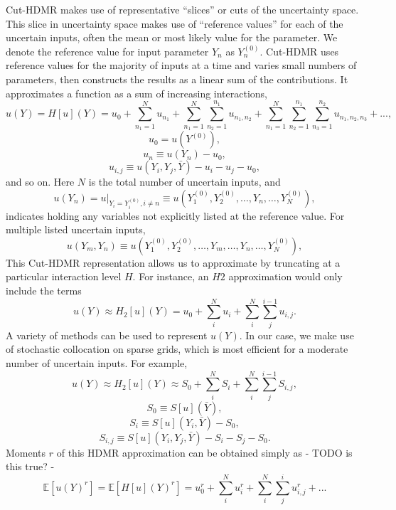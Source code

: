 \documentclass{mc2015}
\newcommand{\expv}[1]{\ensuremath{\mathbb{E}[ #1]}}
\begin{document}
Cut-HDMR makes use of representative ``slices'' or cuts of the uncertainty space.  This slice in uncertainty space makes use of ``reference values'' for each of the uncertain inputs, often the mean or most likely value for the parameter.  We denote the reference value for input parameter $Y_n$ as $Y_n^{(0)}$.  Cut-HDMR uses reference values for the majority of inputs at a time and varies small numbers of parameters, then constructs the results as a linear sum of the contributions.
It approximates a function as a sum of increasing interactions,
\begin{equation}
u(Y)= H[u](Y)=u_0 + \sum_{n_1=1}^N u_{n_1} + \sum_{n_1=1}^N\sum_{n_2=1}^{n_1} u_{n_1,n_2} + 
                     \sum_{n_1=1}^N\sum_{n_2=1}^{n_1}\sum_{n_3=1}^{n_2}u_{n_1,n_2,n_3}+...,
\end{equation}
\begin{equation}
u_0=u(Y^{(0)}),
\end{equation}
\begin{equation}
u_{n}\equiv u(Y_n) - u_0,
\end{equation}
\begin{equation}
u_{i,j}\equiv u(Y_i,Y_j,\bar Y) - u_i - u_j - u_0,
\end{equation}
and so on.  Here $N$ is the total number of uncertain inputs, and 
\begin{equation}
u(Y_{n})=u\big|_{Y_i=Y_i^{(0)},i\neq n}\equiv u(Y_1^{(0)},Y_2^{(0)},\ldots,Y_n,\ldots,Y_N^{(0)}),
\end{equation}
indicates holding any variables not explicitly listed at the reference value.  For multiple listed uncertain inputs,
\begin{equation}
u(Y_m,Y_{n})\equiv u(Y_1^{(0)},Y_2^{(0)},\ldots,Y_m,\ldots,Y_n,\ldots,Y_N^{(0)}),
\end{equation}
This Cut-HDMR representation allows us to approximate by truncating at a particular interaction level $H$.  For instance, an $H2$ approximation would only include the terms
\begin{equation}
u(Y)\approx H_2[u](Y) = u_0 + \sum_i^N u_i + \sum_i^N\sum_j^{i-1} u_{i,j}.
\end{equation}
A variety of methods can be used to represent $u(Y)$.  In our case, we make use of stochastic collocation on sparse grids, which is most efficient for a moderate number of uncertain inputs.  For example,
\begin{equation}
u(Y)\approx H_2[u](Y)\approx S_0 + \sum_i^N S_i + \sum_i^N\sum_j^{i-1} S_{i,j},
\end{equation}
\begin{equation}
S_0\equiv S[u](\bar Y),
\end{equation}
\begin{equation}
S_i\equiv S[u](Y_i,\bar Y) - S_0,
\end{equation}
\begin{equation}
S_{i,j}\equiv S[u](Y_i,Y_j,\bar Y) - S_i - S_j - S_0.
\end{equation}
Moments $r$ of this HDMR approximation can be obtained simply as - TODO is this true? - 
\begin{equation}
\expv{u(Y)^r}=\expv{H[u](Y)^r}=u_0^r + \sum_i^N u_i^r + \sum_i^N\sum_j^i u_{i,j}^r+...
\end{equation}
\end{document}
